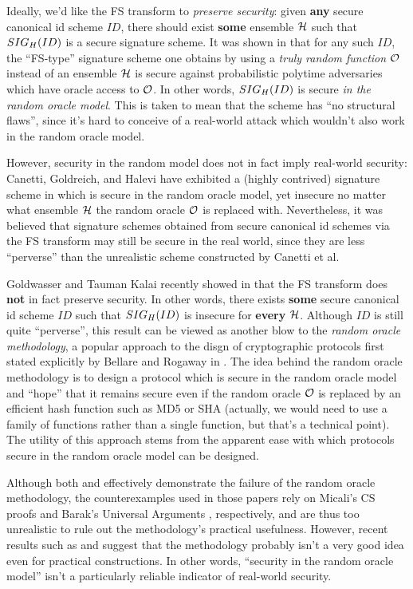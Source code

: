 \documentclass[12pt,twoside]{article}
\begin{document}
Ideally, we'd like the FS transform to {\it preserve security}: given {\bf
any} secure canonical id scheme $ID$, there should exist {\bf some} ensemble
$\fanh$ such that $\fs{ID}{H}$ is a secure signature scheme.
It was shown in \cite{bellare:fiatshamirrom} that for any such $ID$, the 
``FS-type'' signature scheme one obtains by using a {\it truly random 
function} $\fano$ instead of an ensemble $\fanh$ is secure against
probabilistic polytime adversaries which have oracle access to $\fano$.
In other words, $\fs{ID}{H}$ is secure {\it in the random
oracle model}. This is taken to mean that the scheme has ``no structural
flaws'', since it's hard to conceive of a real-world attack which wouldn't
also work in the random oracle model.

However, security in the random model does not in fact imply real-world
security: Canetti, Goldreich, and Halevi have exhibited a (highly contrived) 
signature scheme in \cite{canetti:romfails} which is secure in the random 
oracle model, yet insecure no matter what ensemble $\fanh$ the random oracle 
$\fano$ is replaced with. Nevertheless, it was believed that signature schemes
obtained from secure canonical id schemes via the FS transform may still be
secure in the real world, since they are less ``perverse'' than the
unrealistic scheme constructed by Canetti et al.
 
Goldwasser and Tauman Kalai recently showed in 
\cite{goldwasser:fsparadigmfails} that the FS transform does {\bf not} in
fact preserve security. In other words, there exists {\bf some} secure
canonical id scheme $ID$ such that $\fs{ID}{H}$ is insecure for
{\bf every} $\fanh$. Although $ID$ is still quite ``perverse'', this result can
be viewed as another blow to the {\it random oracle methodology}, a popular 
approach to the disgn of cryptographic protocols first stated explicitly by 
Bellare and Rogaway in \cite{bellare:rompractical}. The idea behind
the random oracle methodology is to design a protocol which is secure in the 
random oracle model and ``hope'' that it remains secure even if the random 
oracle $\fano$ is replaced by an efficient hash function such as MD5 or SHA
(actually, we would need to use a family of functions rather than a single 
function, but that's a technical point). The utility of this approach stems 
from the apparent ease with which protocols secure in the random oracle model 
can be designed. 

Although both \cite{canetti:romfails} and
\cite{goldwasser:fsparadigmfails} effectively demonstrate the failure of the
random oracle methodology, the counterexamples used in those
papers rely on Micali's CS proofs \cite{micali:csproofs} and Barak's 
Universal Arguments \cite{barak:universalarguments}, respectively, and are
thus too unrealistic to rule out the methodology's practical usefulness. 
However, recent results such as \cite{nielsen:noromenc} and 
\cite{bellare:noromsig} suggest that the methodology probably isn't a very 
good idea even for practical constructions. In other words, ``security in the 
random oracle model'' isn't a particularly reliable indicator of real-world 
security.   
\end{document}

